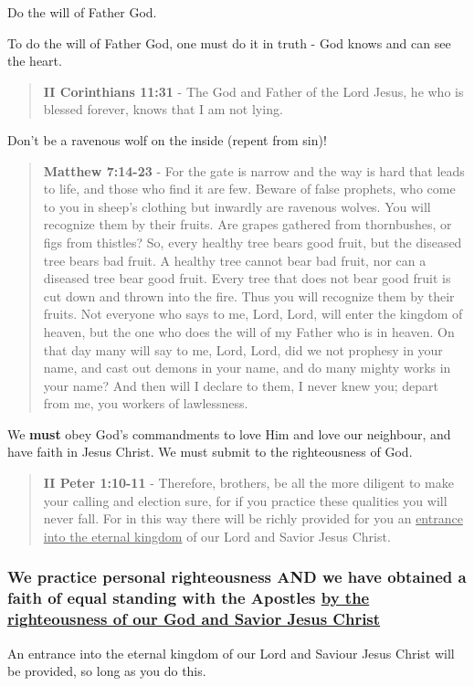\documentclass[11pt]{article}
\begin{document}
Do the will of Father God.

To do the will of Father God, one must do it in truth - God knows and can see the heart.

\begin{quote}
\textbf{II Corinthians 11:31} - The God and Father of the Lord Jesus, he who is blessed forever, knows that I am not lying.
\end{quote}

Don't be a ravenous wolf on the inside (repent from sin)!

\begin{quote}
\textbf{Matthew 7:14-23} - For the gate is narrow and the way is hard that leads to life, and those who find it are few.  Beware of false prophets, who come to you in sheep's clothing but inwardly are ravenous wolves.  You will recognize them by their fruits. Are grapes gathered from thornbushes, or figs from thistles?  So, every healthy tree bears good fruit, but the diseased tree bears bad fruit.  A healthy tree cannot bear bad fruit, nor can a diseased tree bear good fruit.  Every tree that does not bear good fruit is cut down and thrown into the fire.  Thus you will recognize them by their fruits.  Not everyone who says to me, Lord, Lord, will enter the kingdom of heaven, but the one who does the will of my Father who is in heaven.  On that day many will say to me, Lord, Lord, did we not prophesy in your name, and cast out demons in your name, and do many mighty works in your name?  And then will I declare to them, I never knew you; depart from me, you workers of lawlessness.
\end{quote}

We \textbf{must} obey God's commandments to love Him and love our neighbour, and have faith in Jesus Christ.
We must submit to the righteousness of God.

\begin{quote}
\textbf{II Peter 1:10-11} - Therefore, brothers, be all the more diligent to make your calling and election sure, for if you practice these qualities you will never fall. For in this way there will be richly provided for you an \uline{entrance into the eternal kingdom} of our Lord and Savior Jesus Christ.
\end{quote}

\subsubsection{We practice personal righteousness AND we have obtained a faith of equal standing with the Apostles \underline{by the righteousness of our God and Savior Jesus Christ}}
\label{sec:org19e0020}
An entrance into the eternal kingdom of our Lord and Saviour Jesus Christ will
be provided, so long as you do this.
\end{document}
